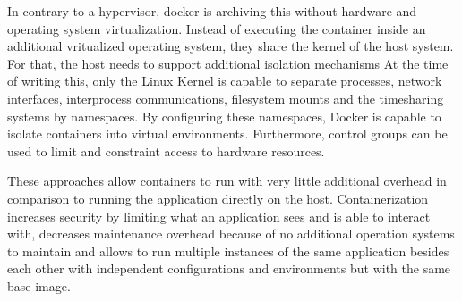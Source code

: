 In contrary to a hypervisor, docker is archiving this without hardware and operating system virtualization.
Instead of executing the container inside an additional vritualized operating system, they share the kernel of the host system.
For that, the host needs to support additional isolation mechanisms
At the time of writing this, only the Linux Kernel is capable to separate processes, network interfaces, interprocess communications, filesystem mounts and the timesharing systems by namespaces.
By configuring these namespaces, Docker is capable to isolate containers into virtual environments.
Furthermore, control groups can be used to limit and constraint access to hardware resources.
\cite{docker:overview}

These approaches allow containers to run with very little additional overhead in comparison to running the application directly on the host.
Containerization increases security by limiting what an application sees and is able to interact with, decreases maintenance overhead because of no additional operation systems to maintain and allows to run multiple instances of the same application besides each other with independent configurations and environments but with the same base image.

